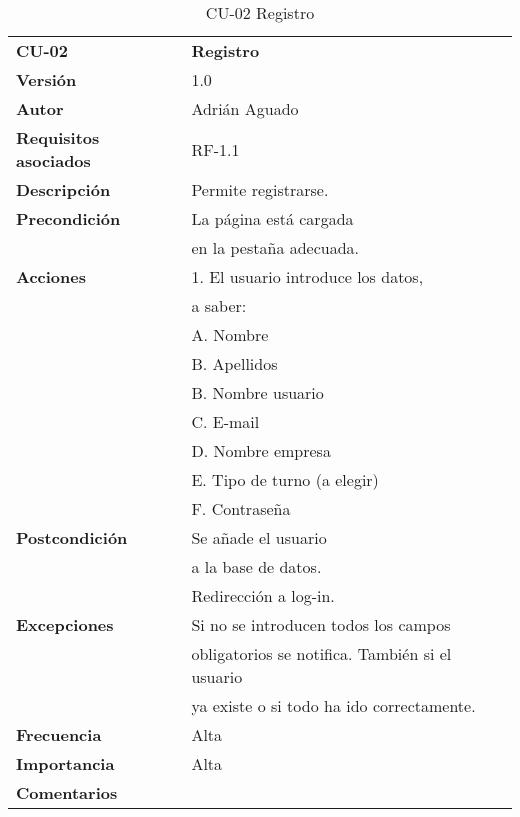 \begin{table}
\begin{tabular}{llr}  
\toprule
\begin{minipage}[b]{0.24\columnwidth}\raggedright\strut
\textbf{CU-02}\strut
\end{minipage} & \begin{minipage}[b]{0.72\columnwidth}\raggedright\strut
\textbf{Registro}\strut
\end{minipage}\tabularnewline
\cmidrule(r){1-2}
\textbf{Versión}       & 1.0           \\
\textbf{Autor}       & Adrián  Aguado    \\
\textbf{Requisitos asociados}       & RF-1.1 \\ 
\textbf{Descripción} & Permite registrarse.\\
\textbf{Precondición} & La página está cargada  \\
& en la pestaña adecuada.     \\
\textbf{Acciones} & 1. El usuario introduce los datos, \\
& a saber: \\
& A. Nombre \\
& B. Apellidos\\
& B. Nombre usuario\\
& C. E-mail\\
& D. Nombre empresa\\
& E. Tipo de turno (a elegir)\\
& F. Contraseña\\
\textbf{Postcondición} & Se añade el usuario \\
& a la base de datos.     \\
& Redirección a log-in.  \\
\textbf{Excepciones} &  Si no se introducen todos los campos  \\
& obligatorios se notifica. También si el usuario \\
& ya existe o si todo ha ido correctamente.    \\
\textbf{Frecuencia} & Alta            \\
\textbf{Importancia} & Alta            \\
\textbf{Comentarios } &       \\
\bottomrule
\end{tabular}
\caption{CU-02 Registro} 
\end{table}

